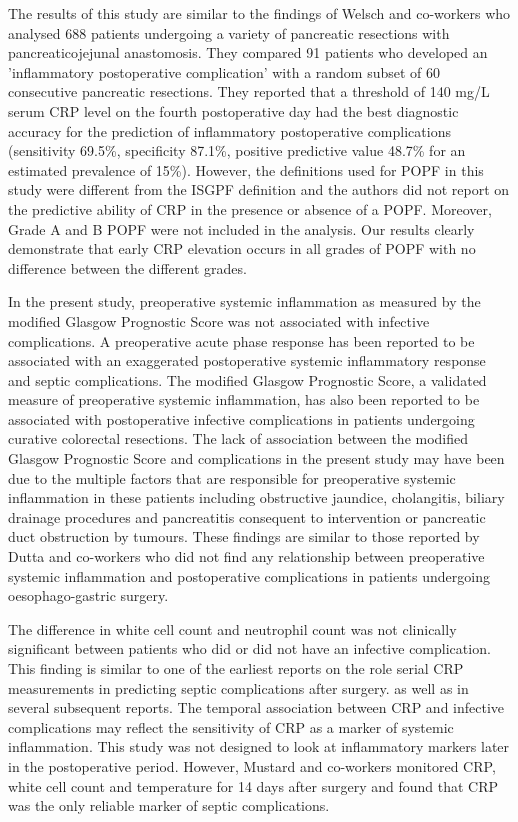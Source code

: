 The results of this study are similar to the findings of Welsch and co-workers who analysed 688 patients undergoing a variety of pancreatic resections with pancreaticojejunal anastomosis.\parencite{welsch_persisting_2008} They compared 91 patients who developed an 'inflammatory postoperative complication' with a random subset of 60 consecutive pancreatic resections. They reported that a threshold of 140 mg/L serum CRP level on the fourth postoperative day had the best diagnostic accuracy for the prediction of inflammatory postoperative complications (sensitivity 69.5\%, specificity 87.1\%, positive predictive value 48.7\% for an estimated prevalence of 15\%). However, the definitions used for POPF in this study were different from the ISGPF definition and the authors did not report on the predictive ability of CRP in the presence or absence of a POPF. Moreover, Grade A and B POPF were not included in the analysis. Our results clearly demonstrate that early CRP elevation occurs in all grades of POPF with no difference between the different grades.

In the present study, preoperative systemic inflammation as measured by the modified Glasgow Prognostic Score was not associated with infective complications. A preoperative acute phase response has been reported to be associated with an exaggerated postoperative systemic inflammatory response and septic complications. \parencite{haupt_association_1997} The modified Glasgow Prognostic Score, a validated measure of preoperative systemic inflammation, has also been reported to be associated with postoperative infective complications in patients undergoing curative colorectal resections.\parencite{moyes_preoperative_2009} The lack of association between the modified Glasgow Prognostic Score and complications in the present study may have been due to the multiple factors that are responsible for preoperative systemic inflammation in these patients including obstructive jaundice, cholangitis, biliary drainage procedures and pancreatitis consequent to intervention or pancreatic duct obstruction by tumours. These findings are similar to those reported by Dutta and co-workers who did not find any relationship between preoperative systemic inflammation and postoperative complications in patients undergoing oesophago-gastric surgery.\parencite{dutta_persistent_2011}

The difference in white cell count and neutrophil count was not clinically significant between patients who did or did not have an infective complication. This finding is similar to one of the earliest reports on the role serial CRP measurements in predicting septic complications after surgery.\parencite{mustard_c-reactive_1987} as well as in several subsequent reports. \parencite{matthiessen_increase_2008, welsch_persisting_2008, dutta_persistent_2011} The temporal association between CRP and infective complications may reflect the sensitivity of CRP as a marker of systemic inflammation. This study was not designed to look at inflammatory markers later in the postoperative period. However, Mustard and co-workers monitored CRP, white cell count and temperature for 14 days after surgery and found that CRP was the only reliable marker of septic complications.

